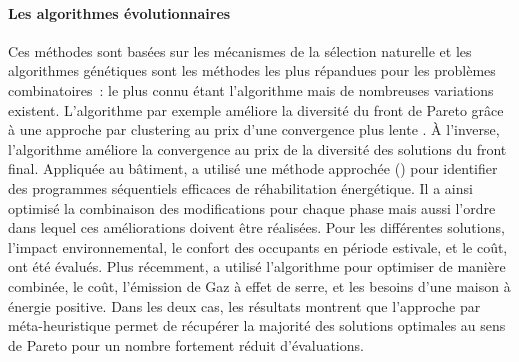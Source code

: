 
\paragraph{Les algorithmes évolutionnaires} %
\label{par:les_algorithmes_evolutionnaires}
Ces méthodes sont basées sur les mécanismes de la sélection naturelle et les algorithmes
génétiques sont les méthodes les plus répandues pour les problèmes combinatoires~:
le plus connu étant l’algorithme 
\parencite{Deb2002182} mais de nombreuses variations existent. L’algorithme
 par exemple améliore la diversité du front de Pareto grâce à une approche
par clustering au prix d’une convergence plus lente \parencite{Zitzler2001}. À
l’inverse, l’algorithme  améliore la convergence au prix
de la diversité des solutions du front final. Appliquée au bâtiment,
\textcite{Rivallain2013} a utilisé une méthode approchée () pour identifier
des programmes séquentiels efficaces de réhabilitation énergétique. Il a ainsi
optimisé la combinaison des modifications pour chaque phase mais aussi l’ordre
dans lequel ces améliorations doivent être réalisées. Pour les différentes
solutions, l’impact environnemental, le confort des occupants en période
estivale, et le coût, ont été évalués. Plus récemment, \textcite{Recht2016} a
utilisé l’algorithme  pour optimiser de manière combinée, le coût,
l’émission de Gaz à effet de serre, et les besoins d’une maison à énergie
positive. Dans les deux cas, les résultats montrent que l’approche par méta-heuristique
permet de récupérer la majorité des solutions optimales au sens de Pareto pour
un nombre fortement réduit d’évaluations.


